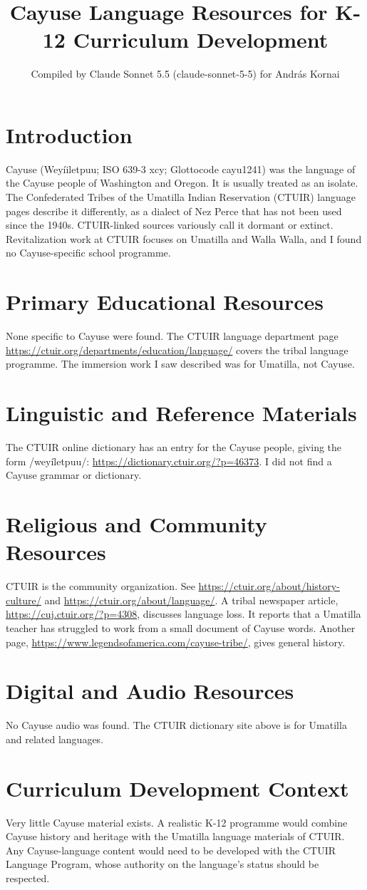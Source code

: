\documentclass[12pt]{article}
\title{Cayuse Language Resources for K-12 Curriculum Development}
\author{Compiled by Claude Sonnet 5.5 (claude-sonnet-5-5) for Andr\'as Kornai}
\date{}
\begin{document}
\maketitle

\section{Introduction}
Cayuse (Weyíiletpuu; ISO 639-3 xcy; Glottocode cayu1241) was the language of the Cayuse people of Washington and Oregon. It is usually treated as an isolate. The Confederated Tribes of the Umatilla Indian Reservation (CTUIR) language pages describe it differently, as a dialect of Nez Perce that has not been used since the 1940s. CTUIR-linked sources variously call it dormant or extinct. Revitalization work at CTUIR focuses on Umatilla and Walla Walla, and I found no Cayuse-specific school programme.

\section{Primary Educational Resources}
None specific to Cayuse were found. The CTUIR language department page \url{https://ctuir.org/departments/education/language/} covers the tribal language programme. The immersion work I saw described was for Umatilla, not Cayuse.

\section{Linguistic and Reference Materials}
The CTUIR online dictionary has an entry for the Cayuse people, giving the form /weyíletpuu/: \url{https://dictionary.ctuir.org/?p=46373}. I did not find a Cayuse grammar or dictionary.

\section{Religious and Community Resources}
CTUIR is the community organization. See \url{https://ctuir.org/about/history-culture/} and \url{https://ctuir.org/about/language/}. A tribal newspaper article, \url{https://cuj.ctuir.org/?p=4308}, discusses language loss. It reports that a Umatilla teacher has struggled to work from a small document of Cayuse words. Another page, \url{https://www.legendsofamerica.com/cayuse-tribe/}, gives general history.

\section{Digital and Audio Resources}
No Cayuse audio was found. The CTUIR dictionary site above is for Umatilla and related languages.

\section{Curriculum Development Context}
Very little Cayuse material exists. A realistic K-12 programme would combine Cayuse history and heritage with the Umatilla language materials of CTUIR. Any Cayuse-language content would need to be developed with the CTUIR Language Program, whose authority on the language's status should be respected.
\end{document}

